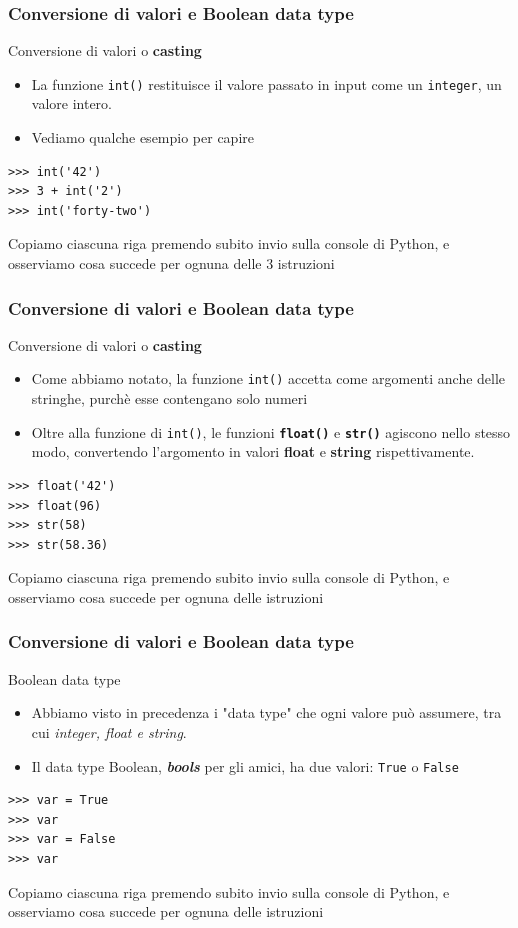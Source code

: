 \documentclass{beamer}
\begin{document}
\begin{frame}[fragile]
\frametitle{Conversione di valori e Boolean data type}
	\begin{block}{Conversione di valori o \textbf{casting}}
	\begin{itemize}
		\item La funzione \texttt{int()} restituisce il valore passato in input come un \texttt{integer}, un valore intero.
		\item Vediamo qualche esempio per capire
	\end{itemize}
	\end{block}
	\begin{lstlisting}
>>> int('42')
>>> 3 + int('2')
>>> int('forty-two')
	\end{lstlisting}
Copiamo ciascuna riga premendo subito invio sulla console di Python, e osserviamo cosa succede per ognuna delle 3 istruzioni

\end{frame}

\begin{frame}[fragile]
\frametitle{Conversione di valori e Boolean data type}
\begin{block}{Conversione di valori o \textbf{casting}}
	\begin{itemize}
		\item Come abbiamo notato, la funzione \texttt{int()} accetta come argomenti anche delle stringhe, purchè esse contengano solo numeri
		\item Oltre alla funzione di \texttt{int()}, le funzioni \textbf{\texttt{float()}} e \textbf{\texttt{str()}} agiscono nello stesso modo, convertendo l'argomento in valori \textbf{float} e \textbf{string} rispettivamente.
	\end{itemize}
\end{block}
\begin{lstlisting}
>>> float('42')
>>> float(96)
>>> str(58)
>>> str(58.36)
\end{lstlisting}
Copiamo ciascuna riga premendo subito invio sulla console di Python, e osserviamo cosa succede per ognuna delle istruzioni
\end{frame}

\begin{frame}[fragile]
\frametitle{Conversione di valori e Boolean data type}
\begin{block}{Boolean data type}
	\begin{itemize}
		\item Abbiamo visto in precedenza i "data type" che ogni valore può assumere, tra cui \textit{integer, float e string}.
		\item Il data type Boolean, \textbf{\textit{bools}} per gli amici, ha due valori: \texttt{True} o \texttt{False}
	\end{itemize}
\end{block}
\begin{lstlisting}
>>> var = True
>>> var
>>> var = False
>>> var
\end{lstlisting}
Copiamo ciascuna riga premendo subito invio sulla console di Python, e osserviamo cosa succede per ognuna delle istruzioni
\end{frame}
\end{document}

